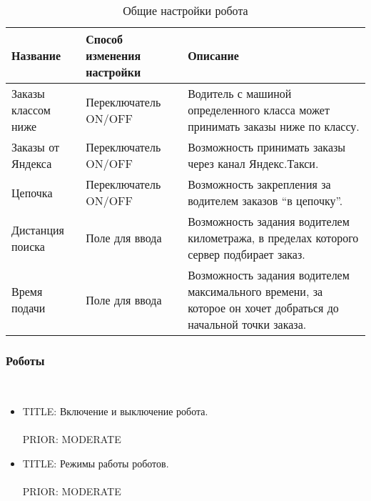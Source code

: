       \begin{table}[h] 
        \begin{center}
        \caption {Общие настройки робота}
        \label{table:driver_app_robot_tab_table_general_settings}
        \setlength{\extrarowheight}{2mm}
        \begin{tabular}{|p{4cm}|p{3cm}|p{8cm}|}

          \hline     \textbf{Название}&\textbf{Способ изменения настройки}&\textbf{Описание} \\ [2mm]

          \hline   Заказы классом ниже & Переключатель ON/OFF & Водитель с машиной определенного класса может принимать заказы ниже по классу.\\ [2mm]

          \hline   Заказы от Яндекса & Переключатель ON/OFF & Возможность принимать заказы через канал Яндекс.Такси. \\ [2mm]
            
          \hline   Цепочка & Переключатель ON/OFF & Возможность закрепления за водителем заказов “в цепочку”. \\ [2mm]

          \hline   Дистанция поиска & Поле для ввода & Возможность задания водителем километража, в пределах которого сервер подбирает заказ. \\ [2mm]

          \hline   Время подачи & Поле для ввода & Возможность задания водителем максимального времени, за которое он хочет добраться до начальной точки заказа. \\ [2mm]

          \hline
        \end{tabular}
        \end{center}
      \end{table}

    \subsubsection{Роботы} \label{driver_app_robot_tab_robot_settings} \mbox{}\\

      \begin{itemize}

        \item{
          TITLE: Включение и выключение робота.\\
          \\
          PRIOR: MODERATE\\
          }

        \item{
          TITLE: Режимы работы роботов. \\
          \\
          PRIOR: MODERATE\\}
      \end{itemize}

